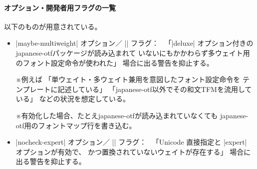 \documentclass[uplatex,dvipdfmx,a4paper]{jsarticle}
\newcommand{\Pkg}[1]{\textsf{#1}}
\newcommand{\Note}{\par\noindent ※}
\newcommand{\Means}{：\ }
\begin{document}
\paragraph{オプション・開発者用フラグの一覧}
以下のものが用意されている。

\begin{itemize}
\item |maybe-multiweight| オプション／%
  |\pxchfonNoCheckMultiweight| フラグ\Means
  「|deluxe| オプション付きの\Pkg{japanese-otf}パッケージが読み込まれて
  いないにもかかわらず多ウェイト用のフォント設定命令が使われた」
  場合に出る警告を抑止する。
  \Note 例えば
  「単ウェイト・多ウェイト兼用を意図したフォント設定命令を
  テンプレートに記述している」
  「\Pkg{japanese-otf}以外でその和文TFMを流用している」
  などの状況を想定している。
  \Note 有効化した場合、たとえ\Pkg{japanese-otf}が読み込まれていなくても
  \Pkg{japanese-otf}用のフォントマップ行を書き込む。
\item |nocheck-expert| オプション／%
  |\pxchfonNoCheckExpert| フラグ\Means
  「Unicode 直接指定と |expert| オプションが有効で、
  かつ置換されていないウェイトが存在する」
  場合に出る警告を抑止する。
\end{itemize}

\end{document}
